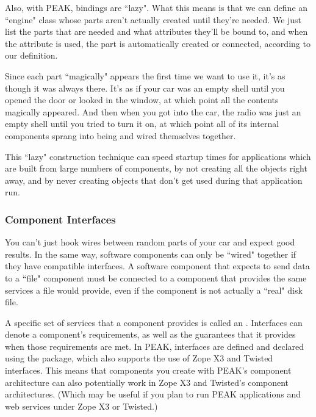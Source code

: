 Also, with PEAK, bindings are ``lazy".  What this means is that we can define
an ``engine" class whose parts aren't actually created until they're needed.
We just list the parts that are needed and what attributes they'll be bound
to, and when the attribute is used, the part is automatically created or
connected, according to our definition.

Since each part ``magically" appears the first time we want to use it, it's
as though it was always there.  It's as if your car was an empty shell until
you opened the door or looked in the window, at which point all the contents
magically appeared.  And then when you got into the car, the radio was just
an empty shell until you tried to turn it on, at which point all of its
internal components sprang into being and wired themselves together.

This ``lazy" construction technique can speed startup times for applications
which are built from large numbers of components, by not creating all the
objects right away, and by never creating objects that don't get used during
that application run.










\subsubsection{Component Interfaces}

You can't just hook wires between random parts of your car and expect good
results.  In the same way, software components can only be ``wired" together
if they have compatible interfaces.  A software component that expects to
send data to a ``file" component must be connected to a component that
provides the same services a file would provide, even if the component is not
actually a ``real" disk file.

A specific set of services that a component provides is called an
.  Interfaces can denote a component's requirements, as well
as the guarantees that it provides when those requirements are met.  In PEAK,
interfaces are defined and declared using the  package,
which also supports the use of Zope X3 and Twisted interfaces.  This means
that components you create with PEAK's component architecture can also
potentially work in Zope X3 and Twisted's component architectures.  (Which may
be useful if you plan to run PEAK applications and web services under Zope X3
or Twisted.)

